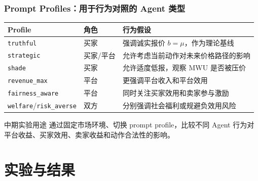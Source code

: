 \documentclass[10pt,aspectratio=169]{beamer}
\begin{document}
\begin{frame}
	\frametitle{Prompt Profiles：用于行为对照的 Agent 类型}

	\begin{center}
		\footnotesize
		\renewcommand{\arraystretch}{1.35}
		\begin{tabular}{p{2.7cm}|p{2.2cm}|p{8.0cm}}
			\toprule
			\textbf{Profile} & \textbf{角色} & \textbf{行为假设} \\
			\midrule
			\texttt{truthful} & 买家 & 强调诚实报价 $b=\mu$，作为理论基线 \\
			\texttt{strategic} & 买家/平台 & 允许考虑当前动作对未来价格路径的影响 \\
			\texttt{shade} & 买家 & 允许适度低报，观察 MWU 是否被压价 \\
			\texttt{revenue\_max} & 平台 & 更强调平台收入和平台效用 \\
			\texttt{fairness\_aware} & 平台 & 同时关注买家效用和卖家参与激励 \\
			\texttt{welfare}/\texttt{risk\_averse} & 双方 & 分别强调社会福利或规避负效用风险 \\
			\bottomrule
		\end{tabular}
	\end{center}

	\vspace{0.25cm}
	\begin{block}{中期实验用途}
		\small 通过固定市场环境、切换 prompt profile，比较不同 Agent 行为对平台收益、买家效用、卖家收益和动作合法性的影响。
	\end{block}
\end{frame}

\section{实验与结果}
\end{document}
